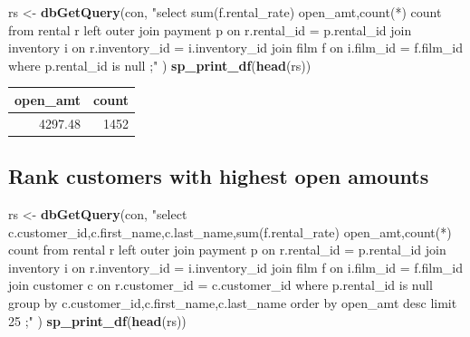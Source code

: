 \documentclass[]{book}
\newenvironment{Shaded}{\begin{snugshade}}{\end{snugshade}}
\newcommand{\KeywordTok}[1]{\textcolor[rgb]{0.13,0.29,0.53}{\textbf{#1}}}
\newcommand{\NormalTok}[1]{#1}
\newcommand{\StringTok}[1]{\textcolor[rgb]{0.31,0.60,0.02}{#1}}
\theoremstyle{definition}
\theoremstyle{definition}
\theoremstyle{definition}
\theoremstyle{remark}
\begin{document}
\begin{Shaded}
\begin{Highlighting}[]
\NormalTok{rs <-}\StringTok{ }\KeywordTok{dbGetQuery}\NormalTok{(con,}
                \StringTok{"select sum(f.rental_rate) open_amt,count(*) count}
\StringTok{                   from rental r }
\StringTok{                        left outer join payment p }
\StringTok{                          on r.rental_id = p.rental_id  }
\StringTok{                        join inventory i}
\StringTok{                          on r.inventory_id = i.inventory_id}
\StringTok{                        join film f}
\StringTok{                          on i.film_id = f.film_id}
\StringTok{                  where p.rental_id is null}
\StringTok{                 ;"}
\NormalTok{                )  }
\KeywordTok{sp_print_df}\NormalTok{(}\KeywordTok{head}\NormalTok{(rs))}
\end{Highlighting}
\end{Shaded}

\begin{tabular}{r|r}
\hline
open\_amt & count\\
\hline
4297.48 & 1452\\
\hline
\end{tabular}

\hypertarget{rank-customers-with-highest-open-amounts}{%
\subsection{Rank customers with highest open
amounts}\label{rank-customers-with-highest-open-amounts}}

\begin{Shaded}
\begin{Highlighting}[]
\NormalTok{rs <-}\StringTok{ }\KeywordTok{dbGetQuery}\NormalTok{(con,}
                \StringTok{"select c.customer_id,c.first_name,c.last_name,sum(f.rental_rate) open_amt,count(*) count}
\StringTok{                   from rental r }
\StringTok{                        left outer join payment p }
\StringTok{                          on r.rental_id = p.rental_id  }
\StringTok{                        join inventory i}
\StringTok{                          on r.inventory_id = i.inventory_id}
\StringTok{                        join film f}
\StringTok{                          on i.film_id = f.film_id}
\StringTok{                        join customer c}
\StringTok{                          on r.customer_id = c.customer_id}
\StringTok{                  where p.rental_id is null}
\StringTok{                  group by c.customer_id,c.first_name,c.last_name}
\StringTok{                  order by open_amt desc}
\StringTok{                  limit 25}
\StringTok{                 ;"}
\NormalTok{                )  }
\KeywordTok{sp_print_df}\NormalTok{(}\KeywordTok{head}\NormalTok{(rs))}
\end{Highlighting}
\end{Shaded}
\end{document}
